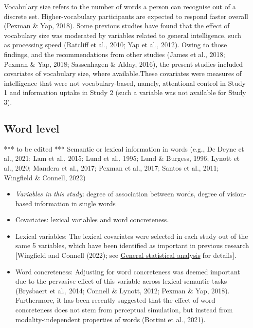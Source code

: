 \documentclass[
  12pt,
  man,floatsintext]{apa7}
\begin{document}
Vocabulary size refers to the number of words a person can recognise out of a discrete set. Higher-vocabulary participants are expected to respond faster overall (Pexman \& Yap, 2018). Some previous studies have found that the effect of vocabulary size was moderated by variables related to general intelligence, such as processing speed (Ratcliff et al., 2010; Yap et al., 2012). Owing to those findings, and the recommendations from other studies (James et al., 2018; Pexman \& Yap, 2018; Sassenhagen \& Alday, 2016), the present studies included covariates of vocabulary size, where available.These covariates were measures of intelligence that were not vocabulary-based, namely, attentional control in Study 1 and information uptake in Study 2 (such a variable was not available for Study 3).

\hypertarget{word-level}{%
\subsection{Word level}\label{word-level}}

*** to be edited *** Semantic or lexical information in words (e.g., De Deyne et al., 2021; Lam et al., 2015; Lund et al., 1995; Lund \& Burgess, 1996; Lynott et al., 2020; Mandera et al., 2017; Pexman et al., 2017; Santos et al., 2011; Wingfield \& Connell, 2022)

\begin{itemize}
\item
  \emph{Variables in this study:} degree of association between words, degree of vision-based information in single words
\item
  Covariates: lexical variables and word concreteness.
\item
  Lexical variables: The lexical covariates were selected in each study out of the same 5 variables, which have been identified as important in previous research {[}Wingfield and Connell (2022); see \protect\hyperlink{general-statistical-analyses}{\underline{General statistical analysis}} for details{]}.
\item
  Word concreteness: Adjusting for word concreteness was deemed important due to the pervasive effect of this variable across lexical-semantic tasks (Brysbaert et al., 2014; Connell \& Lynott, 2012; Pexman \& Yap, 2018). Furthermore, it has been recently suggested that the effect of word concreteness does not stem from perceptual simulation, but instead from modality-independent properties of words (Bottini et al., 2021).
\end{itemize}
\end{document}
